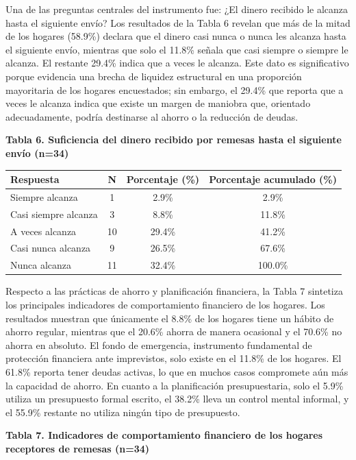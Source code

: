 \documentclass[12pt,letterpaper]{article}
\begin{document}
Una de las preguntas centrales del instrumento fue: ¿El dinero recibido le alcanza hasta el siguiente envío? Los resultados de la Tabla 6 revelan que más de la mitad de los hogares (58.9\%) declara que el dinero casi nunca o nunca les alcanza hasta el siguiente envío, mientras que solo el 11.8\% señala que casi siempre o siempre le alcanza. El restante 29.4\% indica que a veces le alcanza. Este dato es significativo porque evidencia una brecha de liquidez estructural en una proporción mayoritaria de los hogares encuestados; sin embargo, el 29.4\% que reporta que a veces le alcanza indica que existe un margen de maniobra que, orientado adecuadamente, podría destinarse al ahorro o la reducción de deudas.

\textbf{Tabla 6. Suficiencia del dinero recibido por remesas hasta el siguiente envío (n=34)}

\begin{longtable}[]{@{}lccc@{}}
\toprule\noalign{}
Respuesta & N & Porcentaje (\%) & Porcentaje acumulado (\%) \\
\midrule\noalign{}
\endhead
\bottomrule\noalign{}
\endlastfoot
Siempre alcanza & 1 & 2.9\% & 2.9\% \\
Casi siempre alcanza & 3 & 8.8\% & 11.8\% \\
A veces alcanza & 10 & 29.4\% & 41.2\% \\
Casi nunca alcanza & 9 & 26.5\% & 67.6\% \\
Nunca alcanza & 11 & 32.4\% & 100.0\% \\
\end{longtable}

Respecto a las prácticas de ahorro y planificación financiera, la Tabla 7 sintetiza los principales indicadores de comportamiento financiero de los hogares. Los resultados muestran que únicamente el 8.8\% de los hogares tiene un hábito de ahorro regular, mientras que el 20.6\% ahorra de manera ocasional y el 70.6\% no ahorra en absoluto. El fondo de emergencia, instrumento fundamental de protección financiera ante imprevistos, solo existe en el 11.8\% de los hogares. El 61.8\% reporta tener deudas activas, lo que en muchos casos compromete aún más la capacidad de ahorro. En cuanto a la planificación presupuestaria, solo el 5.9\% utiliza un presupuesto formal escrito, el 38.2\% lleva un control mental informal, y el 55.9\% restante no utiliza ningún tipo de presupuesto.

\textbf{Tabla 7. Indicadores de comportamiento financiero de los hogares receptores de remesas (n=34)}
\end{document}
